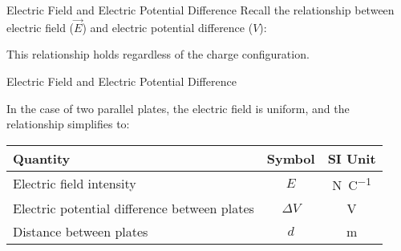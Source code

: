 \documentclass[12pt,aspectratio=169]{beamer}
\begin{document}
\begin{frame}{Electric Field and Electric Potential Difference}
  Recall the relationship between electric field ($\vec E$) and electric
  potential difference ($V$):
    
  
  This relationship holds regardless of the charge configuration.
\end{frame}




\begin{frame}{Electric Field and Electric Potential Difference}
  \begin{center}
  \end{center}
  In the case of two parallel plates, the electric field is uniform, and the
  relationship simplifies to:

  \begin{center}
    \begin{tabular}{l|c|c}
      \rowcolor{pink}
      \textbf{Quantity} & \textbf{Symbol} & \textbf{SI Unit} \\ \hline
      Electric field intensity & $E$ & \si{\newton\per\coulomb}\\
      Electric potential difference between plates & $\Delta V$ &
      \si{\volt} \\
      Distance between plates       & $d$ & \si{\metre}
    \end{tabular}
  \end{center}
\end{frame}
\end{document}
